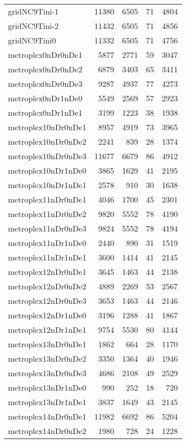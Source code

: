 \begin{longtable}{lrrrr}
gridNC9Tini-1 & 11380 & 6505 & 71 & 4804 \\
gridNC9Tini-2 & 11432 & 6505 & 71 & 4856 \\
gridNC9Tini0 & 11332 & 6505 & 71 & 4756 \\
metroplex0nDr0nDe1 & 5877 & 2771 & 59 & 3047 \\
metroplex0nDr0nDe2 & 6879 & 3403 & 65 & 3411 \\
metroplex0nDr0nDe3 & 9287 & 4937 & 77 & 4273 \\
metroplex0nDr1nDe0 & 5549 & 2569 & 57 & 2923 \\
metroplex0nDr1nDe1 & 3199 & 1223 & 38 & 1938 \\
metroplex10nDr0nDe1 & 8957 & 4919 & 73 & 3965 \\
metroplex10nDr0nDe2 & 2241 & 839 & 28 & 1374 \\
metroplex10nDr0nDe3 & 11677 & 6679 & 86 & 4912 \\
metroplex10nDr1nDe0 & 3865 & 1629 & 41 & 2195 \\
metroplex10nDr1nDe1 & 2578 & 910 & 30 & 1638 \\
metroplex11nDr0nDe1 & 4046 & 1700 & 45 & 2301 \\
metroplex11nDr0nDe2 & 9820 & 5552 & 78 & 4190 \\
metroplex11nDr0nDe3 & 9824 & 5552 & 78 & 4194 \\
metroplex11nDr1nDe0 & 2440 & 890 & 31 & 1519 \\
metroplex11nDr1nDe1 & 3600 & 1414 & 41 & 2145 \\
metroplex12nDr0nDe1 & 3645 & 1463 & 44 & 2138 \\
metroplex12nDr0nDe2 & 4889 & 2269 & 53 & 2567 \\
metroplex12nDr0nDe3 & 3653 & 1463 & 44 & 2146 \\
metroplex12nDr1nDe0 & 3196 & 1288 & 41 & 1867 \\
metroplex12nDr1nDe1 & 9754 & 5530 & 80 & 4144 \\
metroplex13nDr0nDe1 & 1862 & 664 & 28 & 1170 \\
metroplex13nDr0nDe2 & 3350 & 1364 & 40 & 1946 \\
metroplex13nDr0nDe3 & 4686 & 2108 & 49 & 2529 \\
metroplex13nDr1nDe0 & 990 & 252 & 18 & 720 \\
metroplex13nDr1nDe1 & 3837 & 1649 & 43 & 2145 \\
metroplex14nDr0nDe1 & 11982 & 6692 & 86 & 5204 \\
metroplex14nDr0nDe2 & 1980 & 728 & 24 & 1228 \\

\end{longtable}
